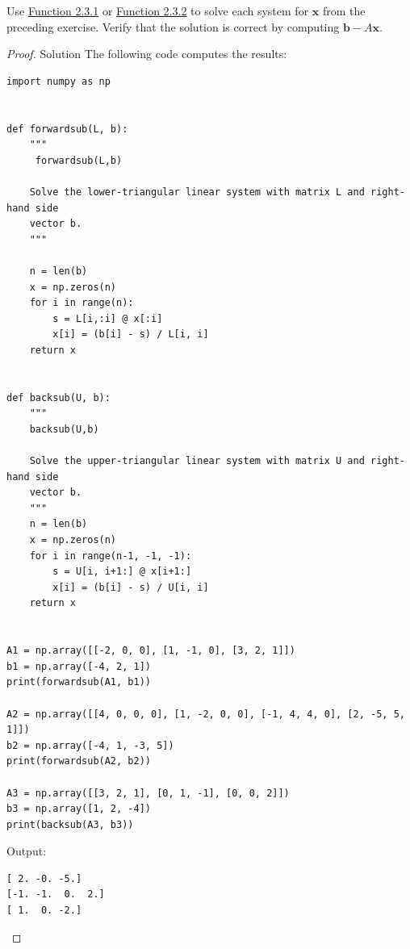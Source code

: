 \documentclass{article}
\renewcommand{\vec}[1]{\mathbf{#1}}
\newenvironment{problem}[2][Problem]{\begin{trivlist}
\item[\hskip \labelsep {\bfseries #1}\hskip \labelsep {\bfseries #2.}]}{\end{trivlist}}
\theoremstyle{definition}
\begin{document}
\begin{problem}{2.3.3}
    Use \href{https://fncbook.com/linear-systems/#function-forwardsub}{Function 2.3.1} or \href{https://fncbook.com/linear-systems/#function-backsub}{Function 2.3.2} to solve each system for $\vec{x}$ from the preceding exercise. Verify that the solution is correct by computing $\vec{b} - A\vec{x}$.
\end{problem}
\begin{proof}{Solution}
The following code computes the results:

\begin{lstlisting}
import numpy as np


def forwardsub(L, b):
    """
     forwardsub(L,b)

    Solve the lower-triangular linear system with matrix L and right-hand side
    vector b.
    """

    n = len(b)
    x = np.zeros(n)
    for i in range(n):
        s = L[i,:i] @ x[:i]
        x[i] = (b[i] - s) / L[i, i]
    return x


def backsub(U, b):
    """
    backsub(U,b)

    Solve the upper-triangular linear system with matrix U and right-hand side
    vector b.
    """
    n = len(b)
    x = np.zeros(n)
    for i in range(n-1, -1, -1):
        s = U[i, i+1:] @ x[i+1:]
        x[i] = (b[i] - s) / U[i, i]
    return x


A1 = np.array([[-2, 0, 0], [1, -1, 0], [3, 2, 1]])
b1 = np.array([-4, 2, 1])
print(forwardsub(A1, b1))

A2 = np.array([[4, 0, 0, 0], [1, -2, 0, 0], [-1, 4, 4, 0], [2, -5, 5, 1]])
b2 = np.array([-4, 1, -3, 5])
print(forwardsub(A2, b2))

A3 = np.array([[3, 2, 1], [0, 1, -1], [0, 0, 2]])
b3 = np.array([1, 2, -4])
print(backsub(A3, b3))
\end{lstlisting}
Output: 
\begin{verbatim}
[ 2. -0. -5.]
[-1. -1.  0.  2.]
[ 1.  0. -2.]
\end{verbatim}
\end{proof}
\end{document}
